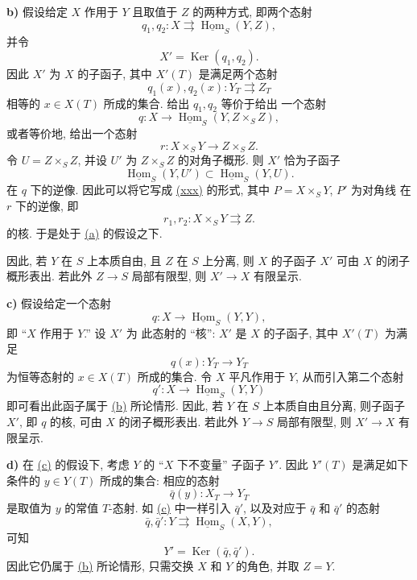 \medskip
{}\label{ex:sga3-VIB-6.2.4-b}%
\noindent\textbf{b)}
假设给定 \(X\) 作用于 \(Y\) 且取值于
\(Z\) 的两种方式, 即两个态射
\[
  q_1,q_2:X\rightrightarrows
  \underline{\operatorname{Hom}}_S(Y,Z),
\]
并令
\[
  X'=\operatorname{Ker}(q_1,q_2).
\]
因此 \(X'\) 为 \(X\) 的子函子, 其中 \(X'(T)\) 是满足两个态射
\[
  q_1(x),q_2(x):Y_T\rightrightarrows Z_T
\]
相等的 \(x\in X(T)\) 所成的集合. 给出 \(q_1,q_2\) 等价于给出
一个态射
\[
  q:X\longrightarrow
  \underline{\operatorname{Hom}}_S(Y,Z\times_S Z),
\]
或者等价地, 给出一个态射
\[
  r:X\times_S Y\longrightarrow Z\times_S Z.
\]
令 \(U=Z\times_S Z\), 并设 \(U'\) 为 \(Z\times_S Z\)
的对角子概形. 则 \(X'\) 恰为子函子
\[
  \underline{\operatorname{Hom}}_S(Y,U')
  \subset
  \underline{\operatorname{Hom}}_S(Y,U).
\]
在 \(q\) 下的逆像. 因此可以将它写成
\hyperref[eq:sga3-VIB-6.2.4-xxx]{\textup{(xxx)}} 的形式, 其中
\(P=X\times_S Y\), \(P'\) 为对角线
在 \(r\) 下的逆像, 即
\[
  r_1,r_2:X\times_S Y\rightrightarrows Z.
\]
的核. 于是处于
\hyperref[ex:sga3-VIB-6.2.4-a]{\textup{(a)}} 的假设之下.

因此, 若 \(Y\) 在 \(S\) 上本质自由, 且 \(Z\)
在 \(S\) 上分离, 则 \(X\) 的子函子 \(X'\)
可由 \(X\) 的闭子概形表出.%
\footnotemark[56]
若此外 \(Z\to S\) 局部有限型, 则
\(X'\to X\) 有限呈示.

\medskip
{}\label{ex:sga3-VIB-6.2.4-c}%
\noindent\textbf{c)}
假设给定一个态射
\[
  q:X\longrightarrow\underline{\operatorname{Hom}}_S(Y,Y),
\]
即 ``\(X\) 作用于 \(Y\).'' 设 \(X'\) 为
此态射的 ``核'': \(X'\) 是 \(X\) 的子函子,
其中 \(X'(T)\) 为满足
\[
  q(x):Y_T\longrightarrow Y_T
\]
为恒等态射的 \(x\in X(T)\) 所成的集合. 令 \(X\) 平凡作用于 \(Y\),
从而引入第二个态射
\[
  q':X\longrightarrow\underline{\operatorname{Hom}}_S(Y,Y)
\]
即可看出此函子属于 \hyperref[ex:sga3-VIB-6.2.4-b]{\textup{(b)}}
所论情形. 因此, 若 \(Y\) 在 \(S\) 上本质自由且分离,
则子函子 \(X'\), 即 \(q\) 的核, 可由
\(X\) 的闭子概形表出.%
\footnotemark[56]
若此外 \(Y\to S\) 局部有限型, 则
\(X'\to X\) 有限呈示.

\medskip
{}\label{ex:sga3-VIB-6.2.4-d}%
\noindent\textbf{d)}
在 \hyperref[ex:sga3-VIB-6.2.4-c]{(c)} 的假设下,
考虑 \(Y\) 的 ``\(X\) 下不变量'' 子函子 \(Y'\).
因此 \(Y'(T)\) 是满足如下条件的 \(y\in Y(T)\) 所成的集合:
相应的态射
\[
  \bar q(y):X_T\longrightarrow Y_T
\]
是取值为 \(y\) 的常值 \(T\)-态射.
如 \hyperref[ex:sga3-VIB-6.2.4-c]{(c)} 中一样引入
\(\bar q'\), 以及对应于 \(\bar q\) 和 \(\bar q'\) 的态射
\[
  \bar q,\bar q':Y\rightrightarrows
  \underline{\operatorname{Hom}}_S(X,Y),
\]
可知
\[
  Y'=\operatorname{Ker}(\bar q,\bar q').
\]
因此它仍属于 \hyperref[ex:sga3-VIB-6.2.4-b]{\textup{(b)}}
所论情形, 只需交换
\(X\) 和 \(Y\) 的角色, 并取 \(Z=Y\).

